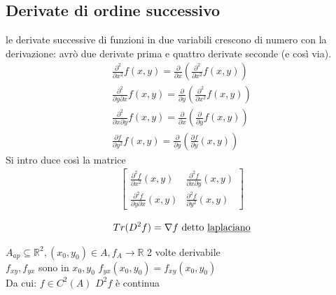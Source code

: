 \documentclass[a4paper, oneside]{article}
\begin{document}
        \subsection{Derivate di ordine successivo}
        le derivate successive di funzioni in due variabili crescono di numero con la derivazione: avrò due derivate prima e quattro derivate seconde (e così via).\\
        \begin{gather*}
            \frac{\partial^2}{\partial x^2} f(x,y) = \frac{\partial}{\partial x} (\frac{\partial^2}{\partial x^2} f(x,y))\\
            \frac{\partial^2}{\partial y\partial x} f(x,y) = \frac{\partial}{\partial y} (\frac{\partial^2}{\partial x^2} f(x,y))\\
            \frac{\partial^2}{\partial x \partial y} f(x,y) = \frac{\partial}{\partial x} (\frac{\partial}{\partial y} f(x,y))\\
            \frac{\partial f}{\partial y^2} f(x,y) = \frac{\partial}{\partial y} (\frac{\partial f }{\partial y}(x,y))
        \end{gather*}
        Si intro duce così la matrice 
        \begin{gather*}
            \begin{bmatrix}
                \frac{\partial^2 f}{\partial x^2} (x,y) & \frac{\partial^2 f}{\partial x \partial y} (x,y)\\
                \frac{\partial^2 f}{\partial y \partial x} (x,y) & \frac{\partial^2 f}{\partial y^2} (x,y) 
            \end{bmatrix}
        \end{gather*}
        \begin{observation}
            \begin{gather*}
                Tr(D^2f) = \nabla f \text{ detto \underbar{laplaciano}}
            \end{gather*}
        \end{observation}
        \begin{theorem}[di Schwarz]
            $A_{ap} \subseteq \mathbb{R}^2, (x_0,y_0) \in A , f_A \to \mathbb{R}$ 2 volte derivabile\\
             $f_{xy}, f_{yx}$ sono  in $x_0,y_0$  $f_{yx}(x_0,y_0) = f_{xy}(x_0,y_0)$\\
            Da cui:  $f \in C^2(A)$  $D^2f$ è continua
        \end{theorem}
\end{document}

